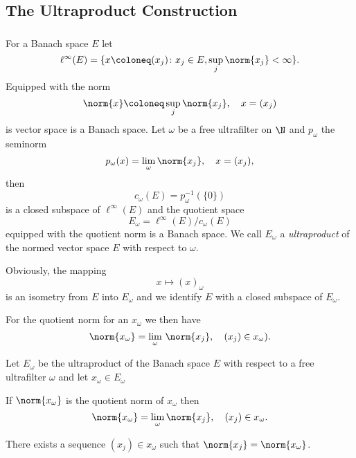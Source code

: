 \documentclass[%
	,english 
	,headings	= small 
	,leqno
	,parskip		= half+
	,DIV			= 14
	,BCOR 			= 10mm	
		]{scrartcl}
\begin{document}
\begin{multicols}{2}
\subsection*{The Ultraproduct Construction}
\subsubsection{}
For a Banach space $ E $ let
%
\[
   \ell^{ \infty }( E ) = \{ x \coloneq ( x_{ j } ) \colon 
   x_{ j } \in E  ,  \sup_{ j } \norm{ x_{ j } } < \infty \}  .  
\]
%
Equipped with the norm 
%
\[
	\norm{x} \coloneq \sup_{j} \norm{x_{j}}, \quad x = (x_{j})
\]
%
is vector space is a Banach space.
Let $ \omega $ be a free ultrafilter on $ \N $ and $ p_{ \omega } $  the seminorm
%
\[
    p_{ \omega }(x) =  \lim_{ \omega } \norm{ x_{ j } } , \quad  x = (x_{j}), 
\]
%
then
%
\[
    c_{ \omega } ( E ) = p_{ \omega }^{ -1 }( \{ 0 \} )
\]
%
is a closed subspace of $ \ell^{ \infty }( E )  $ and the quotient space
%
\[
    E_{ \omega } = \ell^{ \infty }( E ) / c_{ \omega } ( E )
\]
%
equipped with the quotient norm is a Banach space.
We call $ E_{ \omega } $ a \emph{ultraproduct} of the normed vector space $ E $ with respect to $ \omega $.

Obviously, the mapping 
%
\[
    x \mapsto ( x )_{ \omega }
\]
%
is an isometry from $ E $ into $ E_{ \omega } $ and we identify $ E $  with a closed subspace of $ E_{ \omega } $. 
%
\begin{proposition}
For the quotient norm for an $ x_{ \omega } $ we then have 
%
\[
    \norm{ x_{ \omega } } = \lim_{ \omega } \, \norm{ x_{ j } }  ,  \quad ( x_{ j } ) \in x_{ \omega } ) .  
\]
\end{proposition}
%
\begin{proposition}\label{prop:normiert}
Let $ E_{ \omega } $ be the ultraproduct of the Banach space $ E $ with respect to a free ultrafilter $ \omega $ and let $ x_{ \omega} \in E_{ \omega } $

\begin{myenumerate}
\item
If $ \norm{ x_{ \omega } } $ is the quotient norm of $ x_{ \omega } $ then 
%
\[
    \norm{ x_{ \omega } } = \lim_{ \omega }   \norm{ x_{ j } }  ,  \quad ( x_{ j } ) \in x_{ \omega }  .  
\]

\item
There exists a sequence $ ( x_{ j } ) \in x_{ \omega } $ such that $ \norm{x_{j}} = \norm{ x_{ \omega } } $.


\end{myenumerate}
\end{proposition}
\end{multicols}
\end{document}
